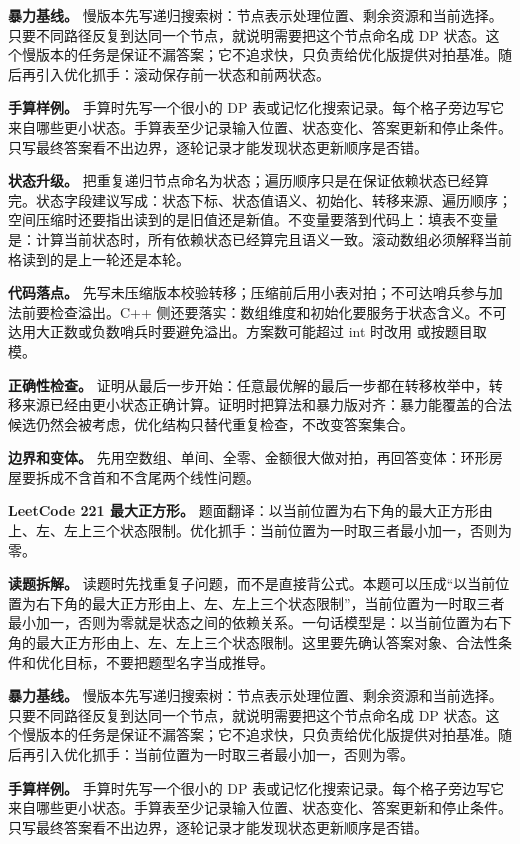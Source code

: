 \textbf{暴力基线。} 慢版本先写递归搜索树：节点表示处理位置、剩余资源和当前选择。只要不同路径反复到达同一个节点，就说明需要把这个节点命名成 DP 状态。这个慢版本的任务是保证不漏答案；它不追求快，只负责给优化版提供对拍基准。随后再引入优化抓手：滚动保存前一状态和前两状态。

\textbf{手算样例。} 手算时先写一个很小的 DP 表或记忆化搜索记录。每个格子旁边写它来自哪些更小状态。手算表至少记录输入位置、状态变化、答案更新和停止条件。只写最终答案看不出边界，逐轮记录才能发现状态更新顺序是否错。

\textbf{状态升级。} 把重复递归节点命名为状态；遍历顺序只是在保证依赖状态已经算完。状态字段建议写成：状态下标、状态值语义、初始化、转移来源、遍历顺序；空间压缩时还要指出读到的是旧值还是新值。不变量要落到代码上：填表不变量是：计算当前状态时，所有依赖状态已经算完且语义一致。滚动数组必须解释当前格读到的是上一轮还是本轮。

\textbf{代码落点。} 先写未压缩版本校验转移；压缩前后用小表对拍；不可达哨兵参与加法前要检查溢出。C++ 侧还要落实：数组维度和初始化要服务于状态含义。不可达用大正数或负数哨兵时要避免溢出。方案数可能超过 int 时改用  或按题目取模。

\textbf{正确性检查。} 证明从最后一步开始：任意最优解的最后一步都在转移枚举中，转移来源已经由更小状态正确计算。证明时把算法和暴力版对齐：暴力能覆盖的合法候选仍然会被考虑，优化结构只替代重复检查，不改变答案集合。

\textbf{边界和变体。} 先用空数组、单间、全零、金额很大做对拍，再回答变体：环形房屋要拆成不含首和不含尾两个线性问题。

\noindent\textbf{LeetCode 221 最大正方形。} 题面翻译：以当前位置为右下角的最大正方形由上、左、左上三个状态限制。优化抓手：当前位置为一时取三者最小加一，否则为零。

\textbf{读题拆解。} 读题时先找重复子问题，而不是直接背公式。本题可以压成“以当前位置为右下角的最大正方形由上、左、左上三个状态限制”，当前位置为一时取三者最小加一，否则为零就是状态之间的依赖关系。一句话模型是：以当前位置为右下角的最大正方形由上、左、左上三个状态限制。这里要先确认答案对象、合法性条件和优化目标，不要把题型名字当成推导。

\textbf{暴力基线。} 慢版本先写递归搜索树：节点表示处理位置、剩余资源和当前选择。只要不同路径反复到达同一个节点，就说明需要把这个节点命名成 DP 状态。这个慢版本的任务是保证不漏答案；它不追求快，只负责给优化版提供对拍基准。随后再引入优化抓手：当前位置为一时取三者最小加一，否则为零。

\textbf{手算样例。} 手算时先写一个很小的 DP 表或记忆化搜索记录。每个格子旁边写它来自哪些更小状态。手算表至少记录输入位置、状态变化、答案更新和停止条件。只写最终答案看不出边界，逐轮记录才能发现状态更新顺序是否错。

